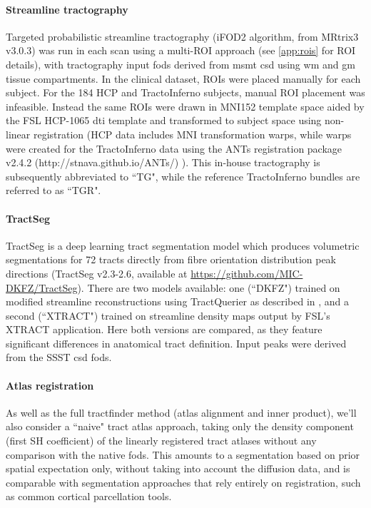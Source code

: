 \paragraph*{Streamline tractography}

Targeted probabilistic streamline tractography (iFOD2 algorithm\autocite{Tournier2010}, from MRtrix3\autocite{Tournier2019} v3.0.3)  was run in each scan using a multi-ROI approach (see \ref{app:rois} for ROI details), with tractography input \glspl{fod} derived from \gls{msmt} \gls{csd} \autocite{Jeurissen2014} using \gls{wm} and \gls{gm} tissue compartments.
In the clinical dataset, ROIs were placed manually for each subject.
For the 184 HCP and TractoInferno subjects, manual ROI placement was infeasible.
Instead the same ROIs were drawn in MNI152 template space aided by the FSL HCP-1065 \gls{dti} template\autocite{FSLATLAS} and transformed to subject space using non-linear registration
(HCP data includes MNI transformation warps, while warps were created for the TractoInferno data using the ANTs registration package v2.4.2 (http://stnava.github.io/ANTs/) \autocite{Tustison2013,Avants2011}).
This in-house tractography is subsequently abbreviated to ``TG", while the reference TractoInferno bundles are referred to as ``TGR".

\paragraph*{TractSeg}

TractSeg \autocite{Wasserthal2018} is a deep learning tract segmentation model which produces volumetric segmentations for 72 tracts directly from fibre orientation distribution peak directions (TractSeg v2.3-2.6, available at \url{https://github.com/MIC-DKFZ/TractSeg}).
There are two models available: one (``DKFZ") trained on modified streamline reconstructions using TractQuerier \autocite{Wassermann2016} as described in \textcite{Wasserthal2018}, and a second (``XTRACT") trained on streamline density maps output by FSL's XTRACT application. \autocite{Warrington2020}
Here both versions are compared, as they feature significant differences in anatomical tract definition.
Input peaks were derived from the SSST \gls{csd} \glspl{fod}.

\paragraph*{Atlas registration}

As well as the full tractfinder method (atlas alignment and inner product), we'll also consider a ``naive" tract atlas approach, taking only the density component (first SH coefficient) of the linearly registered tract atlases without any comparison with the native \glspl{fod}.
This amounts to a segmentation based on prior spatial expectation only, without taking into account the diffusion data, and is comparable with segmentation approaches that rely entirely on registration, such as common cortical parcellation tools.

